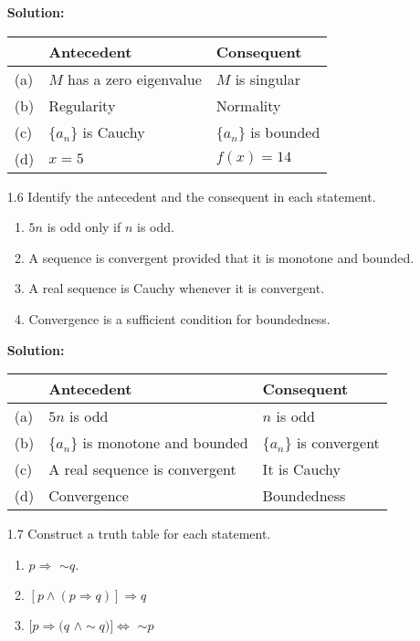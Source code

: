 \begin{enumerate}
      \textbf{Solution:}

      \begin{tabular}{@{}|l|l|l|@{}} 
         \hline & \textbf{Antecedent} & \textbf{Consequent} \\ \hline
         (a) & $M$ has a zero eigenvalue & $M$ is singular \\ \hline
         (b) & Regularity & Normality \\ \hline
         (c) & $\{a_n\}$ is Cauchy & $\{a_n\}$ is bounded \\ \hline
         (d) & $x = 5$ & $f(x) = 14$ \\ \hline
      \end{tabular}

   \item[1.6] Identify the antecedent and the consequent in each statement.
      \begin{enumerate}
         \item $5n$ is odd only if $n$ is odd.
         \item A sequence is convergent provided that it is monotone and
               bounded.
         \item A real sequence is Cauchy whenever it is convergent.
         \item Convergence is a sufficient condition for boundedness.
      \end{enumerate}

      \textbf{Solution:}

      \begin{tabular}{@{}|l|l|l|@{}} 
         \hline & \textbf{Antecedent} & \textbf{Consequent} \\ \hline
         (a) & $5n$ is odd & $n$ is odd \\ \hline
         (b) & $\{a_n\}$ is monotone and bounded & $\{a_n\}$ is
             convergent \\ \hline
         (c) & A real sequence is convergent & It is Cauchy \\ \hline
         (d) & Convergence & Boundedness \\ \hline
      \end{tabular}

   \item[1.7] Construct a truth table for each statement.
      \begin{enumerate}
         \item $p \Rightarrow$ $\sim$$q$.
         \item $[p \land (p \Rightarrow q)] \Rightarrow q$
         \item $[p \Rightarrow (q$ $\land \sim$$q)] \Leftrightarrow$ $\sim$$p$
      \end{enumerate}


\end{enumerate}
